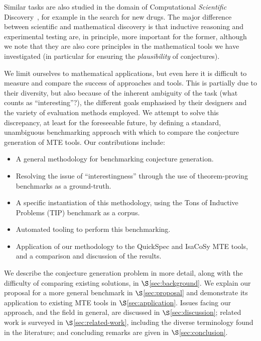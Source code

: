 Similar tasks are also studied in the domain of Computational \emph{Scientific}
Discovery~\cite{king2004functional,Williams20141289,schmidt2009distilling}, for
example in the search for new drugs. The major difference between scientific and
mathematical discovery is that inductive reasoning and experimental testing are,
in principle, more important for the former, although we note that they are also
core principles in the mathematical tools we have investigated (in particular
for ensuring the \emph{plausibility} of conjectures).

We limit ourselves to mathematical applications, but even here it is difficult
to measure and compare the success of approaches and tools. This is partially
due to their diversity, but also because of the inherent ambiguity of the task
(what counts as ``interesting''?), the different goals emphasised by their
designers and the variety of evaluation methods employed. We attempt to solve
this discrepancy, at least for the foreseeable future, by defining a standard,
unambiguous benchmarking approach with which to compare the conjecture
generation of MTE tools. Our contributions include:

\begin{itemize}
\item A general methodology for benchmarking conjecture generation.
\item Resolving the issue of ``interestingness'' through the use of
  theorem-proving benchmarks as a ground-truth.
\item A specific instantiation of this methodology, using the Tons of Inductive
  Problems (TIP) benchmark as a corpus.
\item Automated tooling to perform this benchmarking.
\item Application of our methodology to the QuickSpec and IsaCoSy MTE tools,
  and a comparison and discussion of the results.
\end{itemize}

We describe the conjecture generation problem in more detail, along with the
difficulty of comparing existing solutions, in $\S$\ref{sec:background}. We
explain our proposal for a more general benchmark in $\S$\ref{sec:proposal} and
demonstrate its application to existing MTE tools in $\S$\ref{sec:application}.
Issues facing our approach, and the field in general, are discussed in
$\S$\ref{sec:discussion}; related work is surveyed in
$\S$\ref{sec:related-work}, including the diverse terminology found in the
literature; and concluding remarks are given in $\S$\ref{sec:conclusion}.

